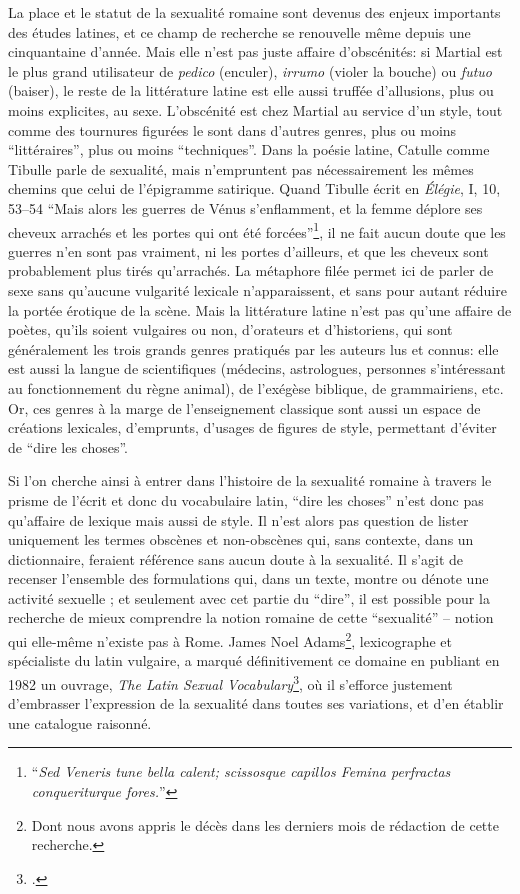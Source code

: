 La place et le statut de la sexualité romaine sont devenus des enjeux importants des études latines, et ce champ de recherche se renouvelle même depuis une cinquantaine d'année. Mais elle n'est pas juste affaire d'obscénités: si Martial est le plus grand utilisateur de \textit{pedico} (enculer), \textit{irrumo} (violer la bouche) ou \textit{futuo} (baiser), le reste de la littérature latine est elle aussi truffée d'allusions, plus ou moins explicites, au sexe. L'obscénité est chez Martial au service d'un style, tout comme des tournures figurées le sont dans d'autres genres, plus ou moins \enquote{littéraires}, plus ou moins \enquote{techniques}. Dans la poésie latine, Catulle comme Tibulle parle de sexualité, mais n'empruntent pas nécessairement les mêmes chemins que celui de l'épigramme satirique. Quand Tibulle écrit en \textit{Élégie}, I, 10, 53--54 \enquote{Mais alors les guerres de Vénus s'enflamment, et la femme déplore ses cheveux arrachés et les portes qui ont été forcées}\footnote{\enquote{\textit{Sed Veneris tune bella calent; scissosque capillos Femina perfractas conqueriturque fores.}}}, il ne fait aucun doute que les guerres n'en sont pas vraiment, ni les portes d'ailleurs, et que les cheveux sont probablement plus tirés qu'arrachés. La métaphore filée permet ici de parler de sexe sans qu'aucune vulgarité lexicale n'apparaissent, et sans pour autant réduire la portée érotique de la scène. Mais la littérature latine n'est pas qu'une affaire de poètes, qu'ils soient vulgaires ou non, d'orateurs et d'historiens, qui sont généralement les trois grands genres pratiqués par les auteurs lus et connus: elle est aussi la langue de scientifiques (médecins, astrologues, personnes s'intéressant au fonctionnement du règne animal), de l'exégèse biblique, de grammairiens, etc. Or, ces genres à la marge de l'enseignement classique sont aussi un espace de créations lexicales, d'emprunts, d'usages de figures de style, permettant d'éviter de \enquote{dire les choses}.

Si l'on cherche ainsi à entrer dans l'histoire de la sexualité romaine à travers le prisme de l'écrit et donc du vocabulaire latin, \enquote{dire les choses} n'est donc pas qu'affaire de lexique mais aussi de style. Il n'est alors pas question de lister uniquement les termes obscènes et non-obscènes qui, sans contexte, dans un dictionnaire, feraient référence sans aucun doute à la sexualité. Il s'agit de recenser l'ensemble des formulations qui, dans un texte, montre ou dénote une activité sexuelle ; et seulement avec cet partie du \enquote{dire}, il est possible pour la recherche de mieux comprendre la notion romaine de cette \enquote{sexualité} -- notion qui elle-même n'existe pas à Rome. James Noel Adams\footnote{Dont nous avons appris le décès dans les derniers mois de rédaction de cette recherche.}, lexicographe et spécialiste du latin vulgaire, a marqué définitivement ce domaine en publiant en 1982 un ouvrage, \textit{The Latin Sexual Vocabulary}\footcite{adams}, où il s'efforce justement d'embrasser l'expression de la sexualité dans toutes ses variations, et d'en établir une catalogue raisonné.

